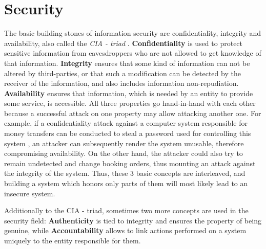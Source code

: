 \section{Security}

The basic building stones of information security are confidentiality, integrity and availability, also called the \textit{CIA - triad} \cite{stallings}.
\textbf{Confidentiality} is used to protect sensitive information from eavesdroppers who are not allowed to get knowledge of that information. 
\textbf{Integrity} ensures that some kind of information can not be altered by third-parties, or that such a modification can be detected by the
receiver of the information, and also includes information non-repudiation.
\textbf{Availability} ensures that information, which is needed by an entity to provide some service, is accessible.
All three properties go hand-in-hand with each other because a successful attack on one property may allow attacking another one. For example, if a
confidentiality attack against a computer system responsible for money transfers can be conducted to steal a password used for controlling this system
, an attacker
can subsequently render the system unusable, therefore compromising availability. On the other hand, the attacker could also try to remain undetected and change
booking orders, thus mounting an attack against the integrity of the system. Thus, these 3 basic concepts are interleaved, and building a system which honors
only parts of them will most likely lead to an insecure system.

Additionally to the CIA - triad, sometimes two more concepts are used in the security field: \textbf{Authenticity} is tied to integrity and ensures the property
of being genuine, while \textbf{Accountability} allows to link actions performed on a system uniquely to the entity responsible for them.
